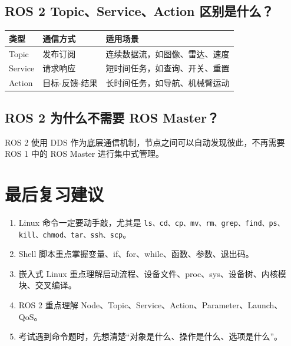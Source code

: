 \documentclass[UTF8,a4paper,12pt]{ctexart}
\begin{document}
\subsection{ROS 2 Topic、Service、Action 区别是什么？}

\begin{longtable}{p{3cm}p{4cm}p{7cm}}
\toprule
类型 & 通信方式 & 适用场景 \\
\midrule
Topic & 发布订阅 & 连续数据流，如图像、雷达、速度 \\
Service & 请求响应 & 短时间任务，如查询、开关、重置 \\
Action & 目标-反馈-结果 & 长时间任务，如导航、机械臂运动 \\
\bottomrule
\end{longtable}

\subsection{ROS 2 为什么不需要 ROS Master？}

ROS 2 使用 DDS 作为底层通信机制，节点之间可以自动发现彼此，不再需要 ROS 1 中的 ROS Master 进行集中式管理。

\section{最后复习建议}

\begin{enumerate}
    \item Linux 命令一定要动手敲，尤其是 \texttt{ls、cd、cp、mv、rm、grep、find、ps、kill、chmod、tar、ssh、scp}。
    \item Shell 脚本重点掌握变量、if、for、while、函数、参数、退出码。
    \item 嵌入式 Linux 重点理解启动流程、设备文件、proc、sys、设备树、内核模块、交叉编译。
    \item ROS 2 重点理解 Node、Topic、Service、Action、Parameter、Launch、QoS。
    \item 考试遇到命令题时，先想清楚“对象是什么、操作是什么、选项是什么”。
\end{enumerate}
\end{document}
